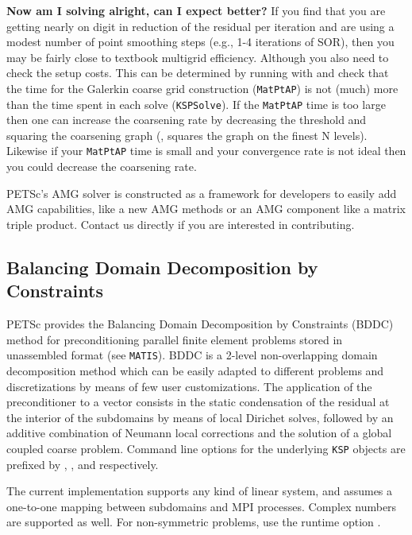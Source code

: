 {\bf Now am I solving alright, can I expect better?}
If you find that you are getting nearly on digit in reduction
of the residual per iteration and are using a modest number of point
smoothing steps (e.g., 1-4 iterations of SOR), then you may be fairly
close to textbook multigrid efficiency.  Although you also need to
check the setup costs.  This can be determined by running with
 and check that the time for the Galerkin coarse grid
construction (\lstinline{MatPtAP}) is not (much) more than the time spent in each
solve (\lstinline{KSPSolve}).  If the \lstinline{MatPtAP} time is too large then one can increase the
coarsening rate by decreasing the threshold and squaring the coarsening
graph (, squares the graph on the finest N levels).
Likewise if your \lstinline{MatPtAP} time is small and your convergence rate is not ideal then you could decrease the coarsening rate.

PETSc's AMG solver is constructed as a framework for developers to
easily add AMG capabilities, like a new AMG methods or an AMG component like a matrix
triple product. Contact us directly if you are interested in contributing.

\subsection{Balancing Domain Decomposition by Constraints}

PETSc provides the Balancing Domain Decomposition by Constraints (BDDC) method for preconditioning
parallel finite element problems stored in unassembled format (see \lstinline{MATIS}). BDDC is a 2-level
non-overlapping domain decomposition method which can be easily adapted to different problems
and discretizations by means of few user customizations. The application of the preconditioner to a vector consists
in the static condensation of the residual at the interior of the subdomains by means of local Dirichet solves, followed by an
additive combination of Neumann local corrections and the solution of a global coupled coarse problem.
Command line options for the underlying \lstinline{KSP} objects are prefixed by , ,
and  respectively.

The current implementation supports any kind of linear system, and assumes a one-to-one mapping between subdomains and
MPI processes. Complex numbers are supported as well. For non-symmetric problems, use the runtime option .

